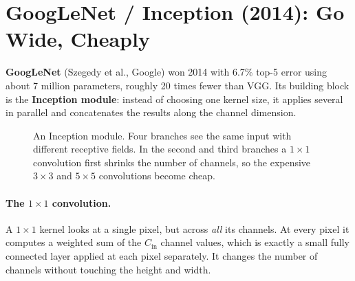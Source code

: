 \documentclass[12pt, a4paper]{article}
\begin{document}
\section{GoogLeNet / Inception (2014): Go Wide, Cheaply}

\textbf{GoogLeNet} (Szegedy et al., Google) won 2014 with 6.7\% top-5 error
using about 7 million parameters, roughly 20 times fewer than VGG. Its
building block is the \textbf{Inception module}: instead of choosing one kernel
size, it applies several in parallel and concatenates the results along the
channel dimension.

\begin{figure}[H]
  \centering
  \caption{An Inception module. Four branches see the same input with
    different receptive fields. In the second and third branches a
    $1 \times 1$ convolution first shrinks the number of channels, so the
    expensive $3\times3$ and $5\times5$ convolutions become cheap.}
  \label{fig:inception}
\end{figure}

\paragraph{The $1 \times 1$ convolution.}
A $1 \times 1$ kernel looks at a single pixel, but across \emph{all} its
channels. At every pixel it computes a weighted sum of the $C_{\text{in}}$
channel values, which is exactly a small fully connected layer applied at
each pixel separately. It changes the number of channels without touching the
height and width.
\end{document}
